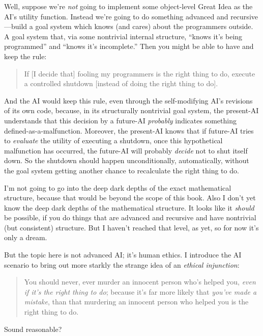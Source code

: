 {
 Well, suppose we're \textit{not} going to
implement some object-level Great Idea as the AI's
utility function. Instead we're going to do something
advanced and recursive---build a goal system which knows (and cares)
about the programmers outside. A goal system that, via some nontrivial
internal structure, ``knows it's being
programmed'' and ``knows
it's incomplete.'' Then you might be
able to have and keep the rule:}

\begin{quote}
{
 If [I decide that] fooling my programmers is the right thing to
do, execute a controlled shutdown [instead of doing the right thing to
  do].}
\end{quote}

{
 And the AI would keep this rule, even through the self-modifying
AI's revisions of its own code, because, in its
structurally nontrivial goal system, the present-AI understands that
this decision by a future-AI \textit{probably} indicates something
defined-as-a-malfunction. Moreover, the present-AI knows that if
future-AI tries to \textit{evaluate} the utility of executing a
shutdown, once this hypothetical malfunction has occurred, the
future-AI will probably \textit{decide} not to shut itself down. So the
shutdown should happen unconditionally, automatically, without the goal
system getting another chance to recalculate the right thing to do.}

{
 I'm not going to go into the deep dark depths of
the exact mathematical structure, because that would be beyond the
scope of this book. Also I don't yet know the deep dark
depths of the mathematical structure. It looks like it \textit{should}
be possible, if you do things that are advanced and recursive and have
nontrivial (but consistent) structure. But I haven't
reached that level, as yet, so for now it's only a
dream.}

{
 But the topic here is not advanced AI; it's human
ethics. I introduce the AI scenario to bring out more starkly the
strange idea of an \textit{ethical injunction}:}

\begin{quote}
{
 You should never, ever murder an innocent person
who's helped you, \textit{even if it's
the right thing to do}; because it's far more likely
that \textit{you've made a mistake}, than that
murdering an innocent person who helped you is the right thing to do.}
\end{quote}

{
 Sound reasonable?}

